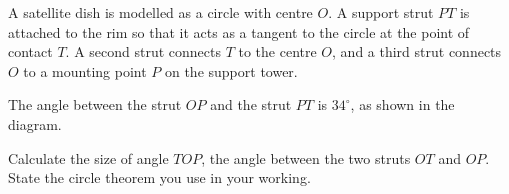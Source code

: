 \begin{question}
\noindent A satellite dish is modelled as a circle with centre $O$. A support strut $PT$ is attached to the rim so that it acts as a tangent to the circle at the point of contact $T$. A second strut connects $T$ to the centre $O$, and a third strut connects $O$ to a mounting point $P$ on the support tower.

The angle between the strut $OP$ and the strut $PT$ is $34^\circ$, as shown in the diagram.

\begin{center}
\end{center}

\noindent Calculate the size of angle $TOP$, the angle between the two struts $OT$ and $OP$.
State the circle theorem you use in your working.

\vspace{4.5cm}

\begin{flushright}
\end{flushright}
\end{question}
